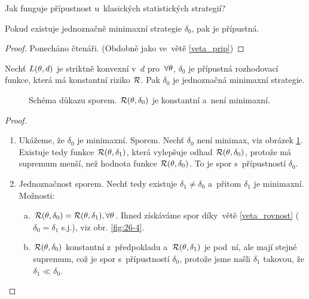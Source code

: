 Jak funguje přípustnost u~klasických statistických strategií?
\begin{theorem}\label{veta_mini}
	Pokud existuje jednoznačně minimaxní strategie $\delta_0$, pak je přípustná.\begin{proof}
		Ponecháno čtenáři. (Obdobně jako ve~větě \ref{veta_prip})
	\end{proof}
\end{theorem}
\begin{theorem}["Obrátka"]
	Nechť $L(\theta,d)$ je striktně konvexní v~$d$ pro~$\forall\theta$, $\delta_0$ je přípustná rozhodovací funkce, která má konstantní riziko $\mathcal{R}$. Pak $\delta_0$ je jednoznačná minimaxní strategie.
	\begin{figure}[h]
		\centering
		\caption{Schéma důkazu sporem. $ \mathcal{R}(\theta,\delta_0)$ je konstantní a~není minimaxní.}
		\label{fig:26-3}
	\end{figure}
	
	\begin{proof}
		\begin{enumerate}[1)]
			\item Ukážeme, že $\delta_0$ je minimaxní. Sporem. Nechť $\delta_0$ není minimax, viz obrázek \ref{fig:26-3}. Existuje tedy funkce $\mathcal{R}(\theta,\delta_1)$, která  vylepšuje odhad $\mathcal{R}(\theta,\delta_0)$, protože má supremum menší, než hodnota funkce $\mathcal{R}(\theta,\delta_0)$. To je spor s~přípustností $\delta_0$.
			\item Jednoznačnost sporem. Nechť tedy existuje $\delta_1\neq\delta_0$ a~přitom $\delta_1$ je minimaxní. Možnosti:
			\begin{enumerate}[a)]
				\item $\mathcal{R}(\theta,\delta_0)=\mathcal{R}(\theta,\delta_1),\forall\theta$. Ihned získáváme spor díky~větě \ref{veta_rovnost} ($\delta_0=\delta_1$ s.j.), viz obr. \ref{fig:26-4}.
				\item $\mathcal{R}(\theta,\delta_0)$ konstantní z~předpokladu a~$\mathcal{R}(\theta,\delta_1)$ je pod~ní, ale mají stejné supremum, což je spor s~přípustností $\delta_0$, protože jsme našli $\delta_1$ takovou, že $\delta_1\ll\delta_0$.
			\end{enumerate}
			

\end{enumerate}
\end{proof}
\end{theorem}
